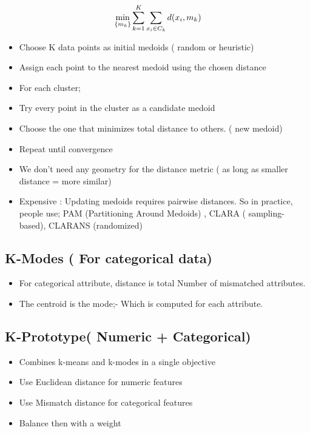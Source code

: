 \documentclass[10pt,a4paper]{article}
\begin{document}
	\begin{align*}
		\Large\min_{\{m_k\}} \sum_{k=1}^{K} \sum_{x_i \in C_k} d(x_i, m_k)
	\end{align*}

	\begin{itemize}
		\item Choose K data points as initial medoids ( random or heuristic)
		\item Assign each point to the nearest medoid using the chosen distance
		\item For each cluster;
		\item Try every point in the cluster as a candidate medoid
		\item Choose the one that minimizes total distance to others. ( new medoid)
		\item Repeat until convergence
		\item We don’t need any geometry for the distance metric ( as long as smaller distance = more similar)
		\item Expensive : Updating medoids requires pairwise distances. So in practice, people use; PAM (Partitioning Around Medoids) , CLARA ( sampling-based), CLARANS (randomized)
	\end{itemize}

	\subsection{K-Modes ( For categorical data)}

	\begin{itemize}
		\item For categorical attribute, distance is total Number of mismatched attributes.
		\item The centroid is the mode;- Which is computed for each attribute.
	\end{itemize}

	\subsection{K-Prototype( Numeric + Categorical)}

	\begin{itemize}
		\item Combines k-means and k-modes in a single objective
		\item Use Euclidean distance for numeric features
		\item Use Mismatch distance for categorical features
		\item Balance then with a weight
	\end{itemize}
\end{document}
